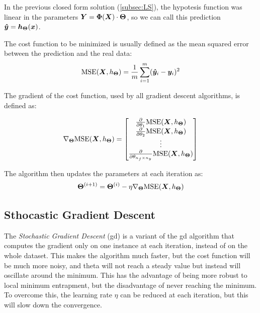 In the previous closed form solution (\autoref{subsec:LS}), the hypotesis function was linear in the parameters $\bm{Y} = \bm{\Phi}(\bm{X})\cdot\bm{\Theta}$, so we can call this prediction $\bm{\hat{y}} = \bm{h}_{\bm{\Theta}}(\bm{x})$.

The cost function to be minimized is usually defined as the mean squared error between the prediction and the real data:
\begin{equation}
    \text{MSE}(\bm{X}, h_{\bm{\Theta}}) = \frac{1}{m}\sum_{i=1}^{m}(\bm{\hat{y}}_i - \bm{y}_i)^2
\end{equation}


The gradient of the cost function, used by all gradient descent algorithms, is defined as:

\begin{equation}
\nabla_{\bm{\Theta}} \text{MSE}(\bm{X}, h_{\bm{\Theta}}) = 
\begin{bmatrix}
    \frac{\partial}{\partial \theta_1} \text{MSE}(\bm{X}, h_{\bm{\Theta}}) \\
    \frac{\partial}{\partial \theta_2} \text{MSE}(\bm{X}, h_{\bm{\Theta}}) \\
    \vdots \\
    \frac{\partial}{\partial \theta_{n_f\times n_y}} \text{MSE}(\bm{X}, h_{\bm{\Theta}}) \\
\end{bmatrix}
\end{equation}

The algorithm then updates the parameters at each iteration as:
\begin{equation}
    \bm{\Theta}^{(i+1)} = \bm{\Theta}^{(i)} - \eta \nabla_{\bm{\Theta}} \text{MSE}(\bm{X}, h_{\bm{\Theta}})
\end{equation}


\subsection{Sthocastic Gradient Descent}
\label{subsec:SGD}
The \emph{Stochastic Gradient Descent} (\gls{gd}) is a variant of the \gls{gd} algorithm that computes the gradient only on one instance at each iteration, instead of on the whole dataset. This makes the algorithm much faster, but the cost function will be much more noisy, and theta will not reach a steady value but instead will oscillate around the minimum. This has the advantage of being more robust to local minimum entrapment, but the disadvantage of never reaching the minimum. To overcome this, the learning rate $\eta$ can be reduced at each iteration, but this will slow down the convergence.

